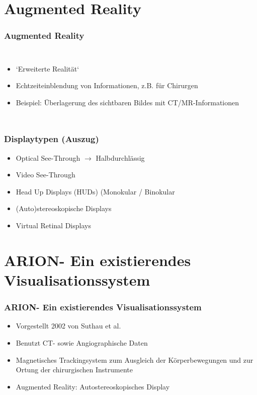 \documentclass[14pt]{beamer}
\begin{document}
\section{Augmented Reality}
\begin{frame}[allowframebreaks]
\frametitle{Augmented Reality}
\begin{columns}
	    \begin{itemize}
	    \item `Erweiterte Realität`
	    \item Echtzeiteinblendung von Informationen, z.B. für Chirurgen
	    \item Beispiel: Überlagerung des sichtbaren Bildes mit CT/MR-Informationen
	    \end{itemize}
\end{columns}
\end{frame}

\begin{frame}
\frametitle{Displaytypen (Auszug)}
\begin{itemize}
 \item Optical See-Through $\rightarrow$ Halbdurchlässig
 \item Video See-Through
 \item Head Up Displays (HUDs) (Monokular / Binokular
 \item (Auto)stereoskopische Displays
 \item Virtual Retinal Displays
\end{itemize}
\end{frame}
%
%
\section{ARION\texttrademark - Ein existierendes Visualisationssystem}
\begin{frame}
\frametitle{ARION\texttrademark - Ein existierendes Visualisationssystem}
\begin{itemize}
\item Vorgestellt 2002 von Suthau et al.
\item Benutzt CT- sowie Angiographische Daten
\item Magnetisches Trackingsystem zum Ausgleich der Körperbewegungen und zur Ortung der chirurgischen Instrumente
\item Augmented Reality: Autostereoskopisches Display
\end{itemize}
\end{frame}
\end{document}
